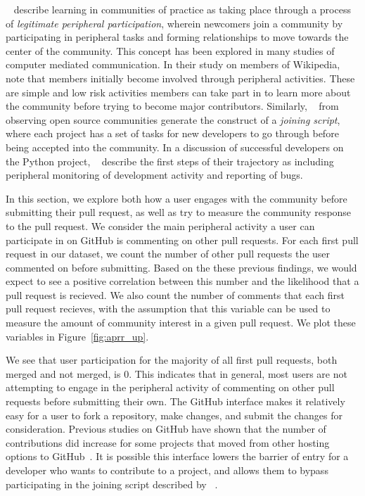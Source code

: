 \documentclass{iitthesis}
\begin{document}

 \label{sec:communities}

~\cite{lave_situated_1991} describe learning in communities of practice as
taking place through a process of \textit{legitimate peripheral participation},
wherein newcomers join a community by participating in peripheral tasks and
forming relationships to move towards the center of the community. This concept
has been explored in many studies of computer mediated communication.  In their
study on members of Wikipedia, ~\cite{bryant_becoming_2005} note that members
initially become involved through peripheral activities. These are simple and
low risk activities members can take part in to learn more about the community
before trying to become major contributors. Similarly,
~\cite{von_krogh_community_2003} from observing open source communities generate
the construct of a \textit{joining script}, where each project has a set of
tasks for new developers to go through before being accepted into the community.
In a discussion of successful developers on the Python project,
~\cite{ducheneaut_socialization_2005} describe the first steps of their
trajectory as including peripheral monitoring of development activity and
reporting of bugs.

In this section, we explore both how a user engages with the community before
submitting their pull request, as well as try to measure the community response
to the pull request.  We consider the main peripheral activity a user can
participate in on GitHub is commenting on other pull requests. For each first
pull request in our dataset, we count the number of other pull requests the user
commented on before submitting. Based on the these previous findings, we would
expect to see a positive correlation between this number and the likelihood that
a pull request is recieved. We also count the number of comments that each first
pull request recieves, with the assumption that this variable can be used to
measure the amount of community interest in a given pull request. We plot these
variables in Figure~\ref{fig:aprr_up}.

We see that user participation for the majority of all first pull requests, both
merged and not merged, is 0. This indicates that in general, most users are not
attempting to engage in the peripheral activity of commenting on other pull
requests before submitting their own. The GitHub interface makes it relatively
easy for a user to fork a repository, make changes, and submit the changes for
consideration. Previous studies on GitHub have shown that the number of
contributions did increase for some projects that moved from other hosting
options to GitHub~\cite{mcdonald_performance_2013}. It is possible this
interface lowers the barrier of entry for a developer who wants to contribute to
a project, and allows them to bypass participating in the joining script
described by ~\cite{von_krogh_community_2003}.
\end{document}
